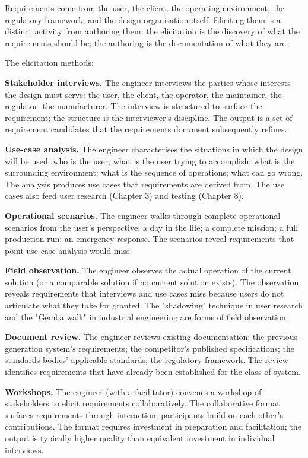 Requirements come from the user, the client, the operating environment, the regulatory framework, and the design organisation itself. Eliciting them is a distinct activity from authoring them: the elicitation is the discovery of what the requirements should be; the authoring is the documentation of what they are.

The elicitation methods:

\textbf{Stakeholder interviews.} The engineer interviews the parties whose interests the design must serve: the user, the client, the operator, the maintainer, the regulator, the manufacturer. The interview is structured to surface the requirement; the structure is the interviewer's discipline. The output is a set of requirement candidates that the requirements document subsequently refines.

\textbf{Use-case analysis.} The engineer characterises the situations in which the design will be used: who is the user; what is the user trying to accomplish; what is the surrounding environment; what is the sequence of operations; what can go wrong. The analysis produces use cases that requirements are derived from. The use cases also feed user research (Chapter 3) and testing (Chapter 8).

\textbf{Operational scenarios.} The engineer walks through complete operational scenarios from the user's perspective: a day in the life; a complete mission; a full production run; an emergency response. The scenarios reveal requirements that point-use-case analysis would miss.

\textbf{Field observation.} The engineer observes the actual operation of the current solution (or a comparable solution if no current solution exists). The observation reveals requirements that interviews and use cases miss because users do not articulate what they take for granted. The "shadowing" technique in user research and the "Gemba walk" in industrial engineering are forms of field observation.

\textbf{Document review.} The engineer reviews existing documentation: the previous-generation system's requirements; the competitor's published specifications; the standards bodies' applicable standards; the regulatory framework. The review identifies requirements that have already been established for the class of system.

\textbf{Workshops.} The engineer (with a facilitator) convenes a workshop of stakeholders to elicit requirements collaboratively. The collaborative format surfaces requirements through interaction; participants build on each other's contributions. The format requires investment in preparation and facilitation; the output is typically higher quality than equivalent investment in individual interviews.

